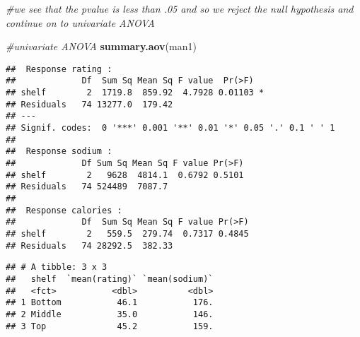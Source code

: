 \documentclass[]{article}
\newenvironment{Shaded}{\begin{snugshade}}{\end{snugshade}}
\newcommand{\CommentTok}[1]{\textcolor[rgb]{0.56,0.35,0.01}{\textit{#1}}}
\newcommand{\DataTypeTok}[1]{\textcolor[rgb]{0.13,0.29,0.53}{#1}}
\newcommand{\KeywordTok}[1]{\textcolor[rgb]{0.13,0.29,0.53}{\textbf{#1}}}
\newcommand{\NormalTok}[1]{#1}
\newcommand{\OperatorTok}[1]{\textcolor[rgb]{0.81,0.36,0.00}{\textbf{#1}}}
\newcommand{\StringTok}[1]{\textcolor[rgb]{0.31,0.60,0.02}{#1}}
\begin{document}
\begin{Shaded}
\begin{Highlighting}[]
\CommentTok{#we see that the pvalue is less than .05 and so we reject the null hypothesis and continue on to univariate ANOVA}

\CommentTok{#univariate ANOVA}
\KeywordTok{summary.aov}\NormalTok{(man1)}
\end{Highlighting}
\end{Shaded}

\begin{verbatim}
##  Response rating :
##             Df  Sum Sq Mean Sq F value  Pr(>F)  
## shelf        2  1719.8  859.92  4.7928 0.01103 *
## Residuals   74 13277.0  179.42                  
## ---
## Signif. codes:  0 '***' 0.001 '**' 0.01 '*' 0.05 '.' 0.1 ' ' 1
## 
##  Response sodium :
##             Df Sum Sq Mean Sq F value Pr(>F)
## shelf        2   9628  4814.1  0.6792 0.5101
## Residuals   74 524489  7087.7               
## 
##  Response calories :
##             Df  Sum Sq Mean Sq F value Pr(>F)
## shelf        2   559.5  279.74  0.7317 0.4845
## Residuals   74 28292.5  382.33
\end{verbatim}

\begin{Shaded}
\end{Shaded}

\begin{verbatim}
## # A tibble: 3 x 3
##   shelf  `mean(rating)` `mean(sodium)`
##   <fct>           <dbl>          <dbl>
## 1 Bottom           46.1           176.
## 2 Middle           35.0           146.
## 3 Top              45.2           159.
\end{verbatim}

\begin{Shaded}
\end{Shaded}
\end{document}
